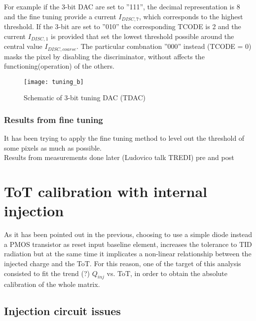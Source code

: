 For example if the 3-bit DAC are set to ''111'', the decimal representation is 8 and the fine tuning provide a current $I_{DISC,7}$, which corresponds to the highest threshold. If the 3-bit are set to ''010'' the corresponding TCODE is 2 and the current $I_{DISC,1}$ is provided that set the lowest threshold possible around the central value $I_{DISC,coarse}$. The particular combnation ''000'' instead (TCODE = 0) masks the pixel by disabling the discriminator, without affects the functioning(operation) of the others.

\begin{figure}
\centering
\texttt{[image: tuning\_b]}
\caption{Schematic of 3-bit tuning DAC (TDAC)}
\label{fig:tdac}
\end{figure}


\subsubsection{Results from fine tuning}

It has been trying to apply the fine tuning method to level out the threshold of some pixels as much as possible. \\

Results from measurements done later (Ludovico talk TREDI) pre and post



\section{ToT calibration with internal injection}



As it has been pointed out in the previous, choosing to use a simple diode instead a PMOS transistor as reset input baseline element, increases the tolerance to TID radiation but at the same time it implicates a non-linear relationship between the injected charge and the ToT.  For this reason, one of the target of this analysis consisted to fit the trend (?) $Q_{inj}$ vs. ToT, in order to obtain the absolute calibration of the whole matrix.


\subsection{Injection circuit issues} \label{inj_issue}


